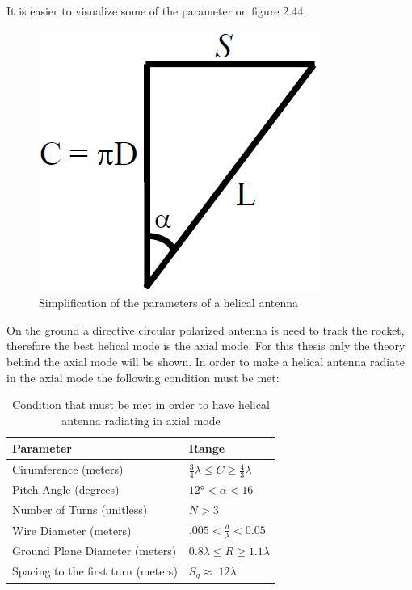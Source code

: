 It is easier to visualize some of the parameter on figure 2.44.

\begin{figure}[h]
\centering
\includegraphics[scale=0.5]{figures/TriangleMath.PNG}
\caption{Simplification of the parameters of a helical antenna}
\end{figure}

On the ground a directive circular polarized antenna is need to track the rocket, therefore the best helical mode is the axial mode. For this thesis only the theory behind the axial mode will be shown. In order to make a helical antenna radiate in the axial mode the following condition must be met:

\begin{table}[h!]
\centering
\begin{tabular}{|l|l|}
\hline
Parameter                          & Range                                                   \\ \hline
Cirumference (meters)              & $\frac{3}{4}\lambda \leq C \geq \frac{4}{3}\lambda$     \\ \hline
Pitch Angle (degrees)              & $\ang{12} < \alpha < 16 $                               \\ \hline
Number of Turns (unitless)         & $N > 3$                                                 \\ \hline
Wire Diameter (meters)             & $.005 < \frac{d}{\lambda} < 0.05$                        \\ \hline
Ground Plane Diameter (meters)     & $0.8\lambda \leq R \geq 1.1\lambda$                     \\ \hline
Spacing to the first turn (meters) & $S_g \approx .12\lambda$                                \\ \hline
\end{tabular}
\caption{Condition that must be met in order to have helical antenna radiating in axial mode}
\end{table}

